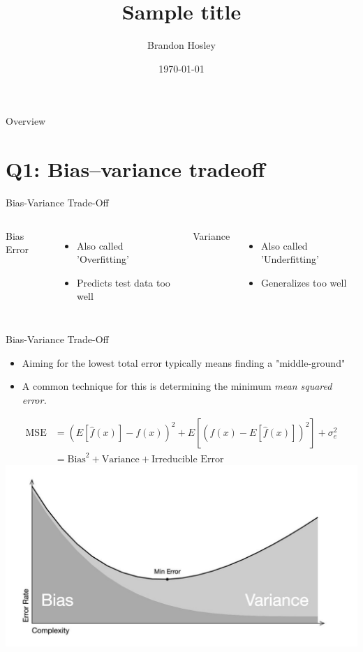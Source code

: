 \documentclass{beamer}
\title{Sample title}
\author{Brandon Hosley}
\institute{University of Illinois - Springfield}
\date{\today}
\begin{document}
\frame{\titlepage}

\begin{frame}{Overview}
\tableofcontents
\end{frame}

\section[Q1]{Q1: Bias–variance tradeoff}

\begin{frame}{Bias-Variance Trade-Off}
	\begin{columns}
		Bias Error
		\begin{itemize}
			\item<1-> Also called 'Overfitting'
			\item<4-> Predicts test data too well
		\end{itemize}
		
		Variance 
		\begin{itemize}
			\item<2-> Also called 'Underfitting'
			\item<5-> Generalizes too well
		\end{itemize}
	\end{columns}
	\centering
\end{frame}

\begin{frame}{Bias-Variance Trade-Off}
	\begin{itemize}%
		\item Aiming for the lowest total error typically means finding a "middle-ground"
		\item A common technique for this is determining the minimum \emph{mean squared error.} 
	\end{itemize}
	\begin{align*}
		\text{MSE} &= \left( E\left[\hat{f}(x)\right]-f(x)\right)^2 + E\left[\left(\hat{f}(x) - E\left[\hat{f}(x)\right]\right)^2\right] +
		\sigma^2_e \\
		&= \text{Bias}^2 + \text{Variance} + \text{Irreducible Error}
	\end{align*}
	\centering
	\includegraphics[width=0.5\linewidth]{MinError}
\end{frame}
\end{document}
